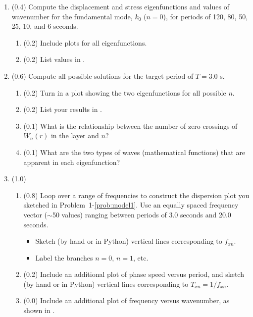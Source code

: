 \documentclass[11pt,titlepage,fleqn]{article}
\newcommand{\cutoff}[1]{{#1}_{x\bar{n}}}
\begin{document}
\begin{enumerate}

\item (0.4) Compute the displacement and stress eigenfunctions and values of wavenumber for the fundamental mode, $k_0$ ($n=0$), for periods of 120, 80, 50, 25, 10, and 6 seconds.

\begin{enumerate}
\item (0.2) Include plots for all eigenfunctions.
\item (0.2) List values in .
\end{enumerate}


\item (0.6) Compute all possible solutions for the target period of $T = 3.0$ s.
%
\begin{enumerate}
\item (0.2) Turn in a plot showing the two eigenfunctions for all possible $n$.

\item (0.2) List your results in .

\item (0.1) What is the relationship between the number of zero crossings of $W_n(r)$ in the layer and $n$?
\item (0.1) What are the two types of waves (\ie mathematical functions) that are apparent in each eigenfunction?
\end{enumerate}


\item (1.0)
\begin{enumerate}
\item (0.8) Loop over a range of frequencies to construct the dispersion plot you sketched in Problem~1-\ref{prob:model1}. Use an equally spaced frequency vector ($\sim$50 values) ranging between periods of 3.0 seconds and 20.0 seconds.
%
\begin{itemize}
\item Sketch (by hand or in Python) vertical lines corresponding to $\cutoff{f}$.
\item Label the branches $n=0$, $n=1$, etc.
\end{itemize}

\item (0.2) Include an additional plot of phase speed versus period, and sketch (by hand or in Python) vertical lines corresponding to $\cutoff{T} = 1/\cutoff{f}$.

\item (0.0) Include an additional plot of frequency versus wavenumber, as shown in .
\end{enumerate}

\end{enumerate}
\end{document}
